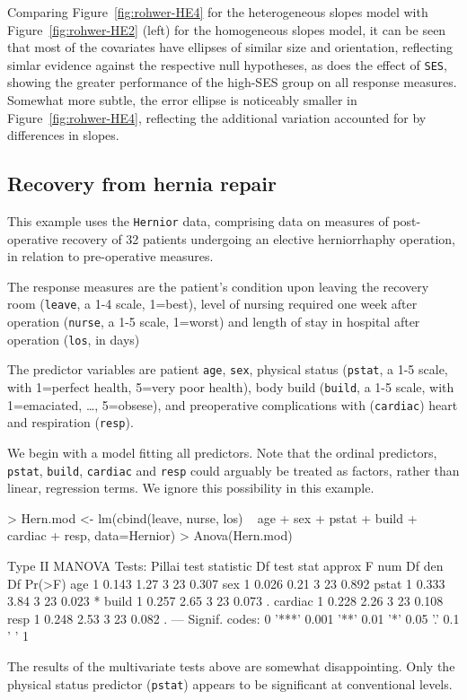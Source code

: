 \documentclass[11pt]{article}
\newcommand{\figref}[1]{Figure~\ref{#1}}
\newcommand{\code}[1]{{\texttt{#1}}}
\begin{document}
Comparing \figref{fig:rohwer-HE4} for the heterogeneous slopes model
with \figref{fig:rohwer-HE2} (left) for the homogeneous slopes model,
it can be seen that most of the covariates have ellipses of similar
size and orientation, reflecting simlar evidence against the respective
null hypotheses, as does the effect of \code{SES}, showing the
greater performance of the high-SES group on all response measures.
Somewhat more subtle, the error ellipse is noticeably smaller in
\figref{fig:rohwer-HE4}, reflecting the additional variation accounted
for by differences in slopes.

\subsection[Hernior data]{Recovery from hernia repair}
This example uses the \code{Hernior} data, comprising
data on measures of post-operative recovery of 32 patients undergoing an
elective herniorrhaphy operation, in relation to pre-operative measures.

The response measures are
the patient's condition upon leaving the recovery room 
(\code{leave}, a 1-4 scale, 1=best),
level of nursing required one week after operation
(\code{nurse}, a 1-5 scale, 1=worst) and 
length of stay in hospital after operation (\code{los}, in days)

The predictor variables are patient \code{age}, \code{sex},
physical status (\code{pstat}, a 1-5 scale, with 1=perfect health, 5=very poor health),
body build (\code{build}, a 1-5 scale, with 1=emaciated, \dots, 5=obsese),
and preoperative complications with (\code{cardiac}) heart and respiration (\code{resp}).

We begin with a model fitting all predictors. Note that the ordinal predictors,
\code{pstat}, \code{build}, \code{cardiac} and \code{resp} could arguably be treated as
factors, rather than linear, regression terms.  We ignore this possibility in this example.

\begin{Schunk}
\begin{Sinput}
> Hern.mod <- lm(cbind(leave, nurse, los) ~ age + sex +  pstat +  build + cardiac + resp, 
                 data=Hernior)
> Anova(Hern.mod) 
\end{Sinput}
\begin{Soutput}
Type II MANOVA Tests: Pillai test statistic
        Df test stat approx F num Df den Df Pr(>F)  
age      1     0.143     1.27      3     23  0.307  
sex      1     0.026     0.21      3     23  0.892  
pstat    1     0.333     3.84      3     23  0.023 *
build    1     0.257     2.65      3     23  0.073 .
cardiac  1     0.228     2.26      3     23  0.108  
resp     1     0.248     2.53      3     23  0.082 .
---
Signif. codes:  0 '***' 0.001 '**' 0.01 '*' 0.05 '.' 0.1 ' ' 1 
\end{Soutput}
\end{Schunk}
The results of the multivariate tests above are somewhat disappointing.  Only the physical status
predictor (\code{pstat}) appears to be significant at conventional levels.
\end{document}
